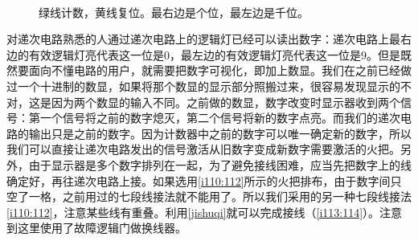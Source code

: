 \begin{figure}[!h]
\begin{center}
\\
\end{center}
\caption{绿线计数，黄线复位。最右边是个位，最左边是千位。}
\label{i108:109}
\end{figure}

对递次电路熟悉的人通过递次电路上的逻辑灯已经可以读出数字：递次电路上最右边的有效逻辑灯亮代表这一位是0，最左边的有效逻辑灯亮代表这一位是9。但是既然要面向不懂电路的用户，就需要把数字可视化，即加上数显。我们在之前已经做过一个十进制的数显，如果将那个数显的显示部分照搬过来，很容易发现显示的不对，这是因为两个数显的输入不同。之前做的数显，数字改变时显示器收到两个信号：第一个信号将之前的数字熄灭，第二个信号将新的数字点亮。而我们的递次电路的输出只是之前的数字。因为计数器中之前的数字可以唯一确定新的数字，所以我们可以直接让递次电路发出的信号激活从旧数字变成新数字需要激活的火把。另外，由于显示器是多个数字排列在一起，为了避免接线困难，应当先把数字上的线确定好，再往递次电路上接。如果选用\autoref{i110:112}所示的火把排布，由于数字间只空了一格，之前用过的七段线接法就不能用了。所以我们采用的另一种七段线接法\autoref{i110:112}，注意某些线有重叠。利用\autoref{jishuqi}就可以完成接线（\autoref{i113:114}）。注意到这里使用了故障逻辑门做换线器。

\begin{figure}[!h]
\begin{center}
\end{center}
\caption{}
\label{i110:112}
\end{figure}

